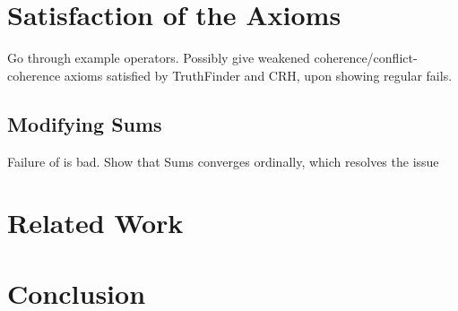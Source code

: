 

\section{Satisfaction of the Axioms}
\label{td_new_sec_satisfaction_of_the_axioms}

\begin{notes}
    Go through example operators. Possibly give weakened
    coherence/conflict-coherence axioms satisfied by TruthFinder and CRH, upon
    showing regular \claimcoherence{} fails.
\end{notes}

\subsection{Modifying Sums}

\begin{notes}
    Failure of \disjointindependence{} is bad. Show that Sums converges
    ordinally, which resolves the issue
\end{notes}

\section{Related Work}

\section{Conclusion}

